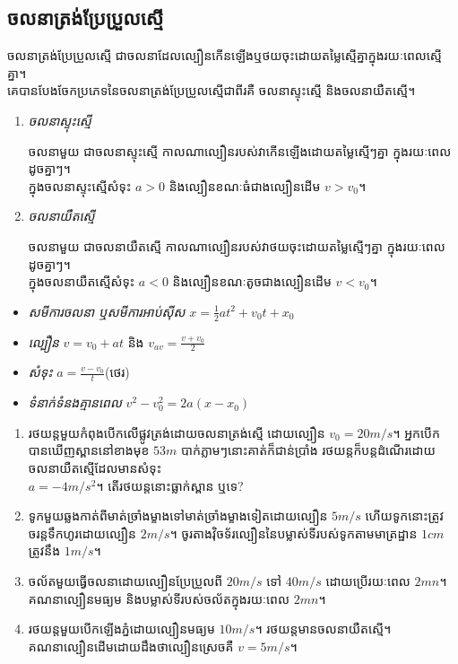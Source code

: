 \subsection{ចលនាត្រង់ប្រែប្រួលស្មើ}
\begin{definition}
	ចលនាត្រង់ប្រែប្រួលស្មើ ជាចលនាដែលល្បឿនកើនឡើងឬថយចុះដោយតម្លៃស្មើគ្នាក្នុងរយៈពេលស្មើគ្នា។\\ គេបានបែងចែកប្រភេទនៃចលនាត្រង់ប្រែប្រួលស្មើជាពីរគឺ ចលនាស្ទុះស្មើ និងចលនាយឺតស្មើ។
\end{definition}
\newpage
\begin{enumerate}
	\item \emph{\kml ចលនាស្ទុះស្មើ}
	\begin{definition}
		ចលនាមួយ ជាចលនាស្ទុះស្មើ កាលណាល្បឿនរបស់វាកើនឡើងដោយតម្លៃស្មើៗគ្នា ក្នុងរយៈពេលដូចគ្នាៗ។\\ ក្នុងចលនាស្ទុះស្មើសំទុះ $a>0$ និងល្បឿនខណៈធំជាងល្បឿនដើម $v>v_{0}$។
	\end{definition}
	\item \emph{\kml ចលនាយឺតស្មើ}
	\begin{definition}
		ចលនាមួយ ជាចលនាយឺតស្មើ កាលណាល្បឿនរបស់វាថយចុះដោយតម្លៃស្មើៗគ្នា ក្នុងរយៈពេលដូចគ្នាៗ។\\ ក្នុងចលនាយឺតស្មើសំទុះ $a<0$ និងល្បឿនខណៈតូចជាងល្បឿនដើម $v<v_{0}$។
	\end{definition}
\end{enumerate}
	\begin{multicols}{2}
		\begin{itemize}
			\item \emph{\kml សមីការចលនា ឬសមីការអាប់ស៊ីស} $x=\frac{1}{2}at^{2}+v_{0}t+x_{0}$
			\item \emph{\kml ល្បឿន} $v=v_{0}+at$ និង $v_{av}=\frac{v+v_{0}}{2}$
			\item \emph{\kml សំទុះ} $a=\frac{v-v_{0}}{t}$(ថេរ)
			\item \emph{\kml ទំនាក់ទំនងគ្មានពេល} $v^{2}-v^{2}_{0}=2a\left(x-x_{0}\right)$
		\end{itemize}
	\end{multicols}
	\begin{exercise}
		\begin{enumerate}
			\item រថយន្តមួយកំពុងបើកលើផ្លូវត្រង់ដោយចលនាត្រង់ស្មើ ដោយល្បឿន $v_{0}=20m/s$។ អ្នកបើកបានឃើញស្ពាននៅខាងមុខ $53m$ បាក់ភ្លាមៗនោះគាត់ក៏ជាន់ប្រាំង រថយន្តក៏បន្តដំណើរដោយចលនាយឺតស្មើដែលមានសំទុះ\\ $a=-4m/s^{2}$។ តើរថយន្តនោះធ្លាក់ស្ពាន ឬទេ?
			\item ទូកមួយឆ្លងកាត់ពីមាត់ច្រាំងម្ខាងទៅមាត់ច្រាំងម្ខាងទៀតដោយល្បឿន $5m/s$ ហើយទូកនោះត្រូវចរន្តទឹកហូរដោយល្បឿន $2m/s$។ ចូរតាងវ៉ិចទ័រល្បឿននៃបម្លាស់ទីរបស់ទូកតាមមាត្រដ្ឋាន $1cm$ ត្រូវនឹង $1m/s$។
			\item ចល័តមួយធ្វើចលនាដោយល្បឿនប្រែប្រួលពី $20m/s$ ទៅ $40m/s$ ដោយប្រើរយៈពេល $2mn$។ \\គណនាល្បឿនមធ្យម និងបម្លាស់ទីរបស់ចល័តក្នុងរយៈពេល $2mn$។
			\item រថយន្តមួយបើកឡើងភ្នំដោយល្បឿនមធ្យម $10m/s$។ រថយន្តមានចលនាយឺតស្មើ។\\ គណនាល្បឿនដើមដោយដឹងថាល្បឿនស្រេចគឺ $v=5m/s$។
		\end{enumerate}
	\end{exercise}
\newpage
